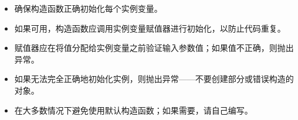 
\begin{itemize}
\item
确保构造函数正确初始化每个实例变量。

\item
如果可用，构造函数应调用实例变量赋值器进行初始化，以防止代码重复。

\item
赋值器应在将值分配给实例变量之前验证输入参数值；如果值不正确，则抛出异常。

\item
如果无法完全正确地初始化实例，则抛出异常——不要创建部分或错误构造的对象。

\item
在大多数情况下避免使用默认构造函数；如果需要，请自己编写。
\end{itemize}

